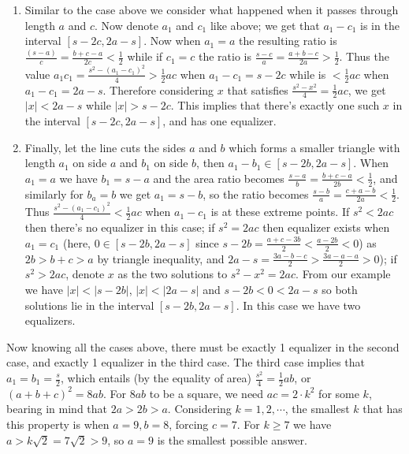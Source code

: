 \documentclass[11pt,a4paper]{article}
\newcommand{\<}{\langle}
\renewcommand{\>}{\rangle}
\begin{document}
\begin{enumerate}
\begin{enumerate}
	\item Similar to the case above we consider what happened when it passes through length $a$ and $c$. Now denote $a_1$ and $c_1$ like above; we get that $a_1-c_1$ is in the interval $[s-2c, 2a-s]$. Now when $a_1=a$ the resulting ratio is $\frac{(s-a)}{c}=\frac{b+c-a}{2c}<\frac 12$ while if $c_1=c$ the ratio is $\frac{s-c}{a}=\frac{a+b-c}{2a}>\frac 12$. Thus the value $a_1c_1=\frac{s^2-(a_1-c_1)^2}{4}>\frac 12 ac$ when $a_1-c_1=s-2c$ while is $<\frac 12 ac$ when $a_1-c_1=2a-s$. Therefore considering $x$ that satisfies $\frac{s^2-x^2}{4}=\frac 12 ac$, we get $|x|< 2a-s$ while $|x|>s-2c$. This implies that there's exactly one such $x$ in the interval $[s-2c, 2a-s]$, and has one equalizer. 
	
	\item Finally, let the line cuts the sides $a$ and $b$ which forms a smaller triangle with length $a_1$ on side $a$ and $b_1$ on side $b$, then $a_1-b_1\in [s-2b, 2a-s]$. When $a_1=a$ we have $b_1=s-a$ and the area ratio becomes $\frac{s-a}{b}=\frac{b+c-a}{2b}<\frac 12$, and similarly for $b_a=b$ we get $a_1=s-b$, so the ratio becomes $\frac{s-b}{a}=\frac{c+a-b}{2a}<\frac 12$. Thus $\frac{s^2-(a_1-c_1)^2}{4}<\frac 12 ac$ when $a_1-c_1$ is at these extreme points. If $s^2<2ac$ then there's no equalizer in this case; if $s^2=2ac$ then equalizer exists when $a_1=c_1$ (here, $0\in [s-2b, 2a-s]$ since $s-2b=\frac{a+c-3b}{2}<\frac{a-2b}{2}<0$) as $2b>b+c>a$ by triangle inequality, and $2a-s=\frac{3a-b-c}{2}>\frac{3a-a-a}{2}>0$); if $s^2>2ac$, denote $x$ as the two solutions to $s^2-x^2=2ac$. From our example we have $|x|<|s-2b|$, $|x|<|2a-s|$ and $s-2b<0<2a-s$ so both solutions lie in the interval $[s-2b, 2a-s]$. In this case we have two equalizers. 
\end{enumerate}
Now knowing all the cases above, there must be exactly 1 equalizer in the second case, and exactly 1 equalizer in the third case. The third case implies that $a_1=b_1=\frac{s}{2}$, which entails (by the equality of area) $\frac{s^2}{4}=\frac 12 ab$, or $(a+b+c)^2=8ab$. For $8ab$ to be a square, we need $ac=2\cdot k^2$ for some $k$, bearing in mind that $2a>2b>a$. Considering $k=1, 2, \cdots$, the smallest $k$ that has this property is when $a=9, b=8$, forcing $c=7$. For $k\ge 7$ we have $a>k\sqrt{2}=7\sqrt{2}>9$, so $a=9$ is the smallest possible answer. 
\end{enumerate}
\end{document}
